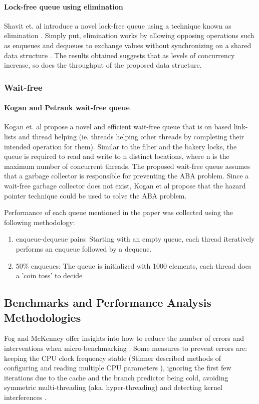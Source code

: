 \documentclass[a4paper, 12pt, titlepage]{article}
\begin{document}
\begin{onehalfspacing}
\paragraph{Lock-free queue using elimination}
Shavit et. al introduce a novel lock-free queue using a technique known as elimination \cite{moir2005using}. Simply put, elimination works by allowing opposing operations such as enqueues and dequeues to exchange values without synchronizing on a shared data structure \cite{shavit1997elimination, moir2005using}. The results obtained suggests that as levels of concurrency increase, so does the throughput of the proposed data structure.

\subsubsection{Wait-free}
\label{wait-free-queues}
\paragraph{Kogan and Petrank wait-free queue}
\label{kp-queue}
Kogan et. al propose a novel and efficient wait-free queue that is on based link-lists and thread helping (ie. threads helping other threads by completing their intended operation for them)\cite{kogan2011wait}. Similar to the filter and the bakery locks, the queue is required to read and write to n distinct locations, where n is the maximum number of concurrent threads\cite{herlihy2020art}.
The proposed wait-free queue assumes that a garbage collector is responsible for preventing the ABA problem. Since a wait-free garbage collector does not exist, Kogan et al propose that the hazard pointer technique could be used to solve the ABA problem.

Performance of each queue mentioned in the paper was collected using the following methodology:
\begin{enumerate}
  \item enqueue-dequeue pairs: Starting with an empty queue, each thread iteratively performs an enqueue followed by a dequeue.
  \item 50\% enqueues: The queue is initialized with 1000 elements, each thread does a 'coin toss' to decide
\end{enumerate}


\subsection{Benchmarks and Performance Analysis Methodologies}
Fog and McKenney offer insights into how to reduce the number of errors and interventions when micro-benchmarking \cite{fog1996optimizing,fog2020optimizing, mckenney2017parallel}. Some measures to prevent errors are: keeping the CPU clock frequency stable (Stinner described methods of configuring and reading multiple CPU parameters \cite{stinnerpstate}), ignoring the first few iterations due to the cache and the branch predictor being cold\cite{fog1996optimizing}, avoiding symmetric multi-threading (aka. hyper-threading) \cite{fog2020optimizing} and detecting kernel interferences \cite[Chapter~11.7]{mckenney2017parallel}.


\end{onehalfspacing}
\end{document}
